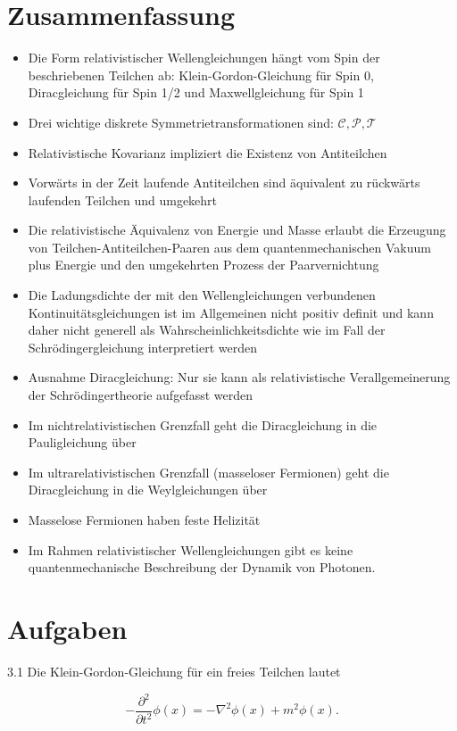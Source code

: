 \documentclass[10pt, letterpaper]{article}
\begin{document}
\section*{Zusammenfassung}
\begin{itemize}
  \item Die Form relativistischer Wellengleichungen hängt vom Spin der beschriebenen Teilchen ab: Klein-Gordon-Gleichung für Spin 0, Diracgleichung für Spin 1/2 und Maxwellgleichung für Spin 1
  \item Drei wichtige diskrete Symmetrietransformationen sind: $\mathcal{C}, \mathcal{P}, \mathcal{T}$
  \item Relativistische Kovarianz impliziert die Existenz von Antiteilchen
  \item Vorwärts in der Zeit laufende Antiteilchen sind äquivalent zu rückwärts laufenden Teilchen und umgekehrt
  \item Die relativistische Äquivalenz von Energie und Masse erlaubt die Erzeugung von Teilchen-Antiteilchen-Paaren aus dem quantenmechanischen Vakuum plus Energie und den umgekehrten Prozess der Paarvernichtung
  \item Die Ladungsdichte der mit den Wellengleichungen verbundenen Kontinuitätsgleichungen ist im Allgemeinen nicht positiv definit und kann daher nicht generell als Wahrscheinlichkeitsdichte wie im Fall der Schrödingergleichung interpretiert werden
  \item Ausnahme Diracgleichung: Nur sie kann als relativistische Verallgemeinerung der Schrödingertheorie aufgefasst werden
  \item Im nichtrelativistischen Grenzfall geht die Diracgleichung in die Pauligleichung über
  \item Im ultrarelativistischen Grenzfall (masseloser Fermionen) geht die Diracgleichung in die Weylgleichungen über
  \item Masselose Fermionen haben feste Helizität
  \item Im Rahmen relativistischer Wellengleichungen gibt es keine quantenmechanische Beschreibung der Dynamik von Photonen.
\end{itemize}

\section*{Aufgaben}
3.1 Die Klein-Gordon-Gleichung für ein freies Teilchen lautet

$$
-\frac{\partial^{2}}{\partial t^{2}} \phi(x)=-\nabla^{2} \phi(x)+m^{2} \phi(x) .
$$
\end{document}
